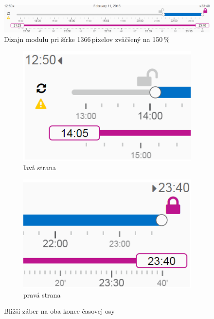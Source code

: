 \documentclass[
  digital, %
  twoside, %
  notable,   %
  nolof,   %
  nolot,   %
]{fithesis3}
\begin{document}
\begin{figure}[H]
	\center
	\includegraphics[width=1.0\linewidth]{slider_150}
	\caption{Dizajn modulu pri šírke 1366\,pixelov zväčšený na 150\,\%}
	\label{slider_150}
\end{figure}

\begin{figure}
\centering
\begin{subfigure}{.5\textwidth}
  \centering
  \includegraphics[width=.9\linewidth]{slider_left_150}
  \caption{ľavá strana}
  \label{slider_detail_150_left}
\end{subfigure}%
\begin{subfigure}{.5\textwidth}
  \centering
  \includegraphics[width=.9\linewidth]{slider_right_150}
  \caption{pravá strana}
\end{subfigure}
\caption{Bližší záber na oba konce časovej osy}
\label{slider_detail_150}
\end{figure}
\end{document}
